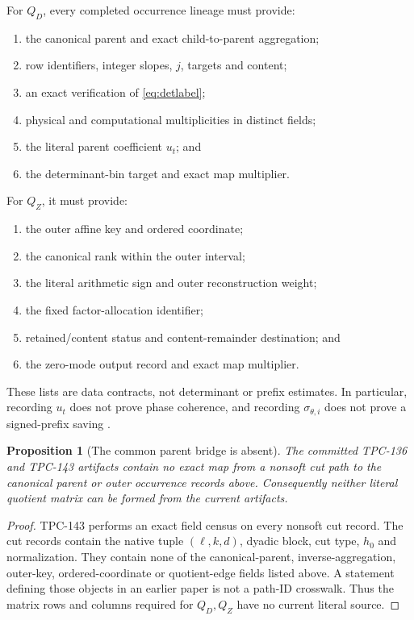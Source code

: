 \documentclass[11pt]{article}
\newtheorem{proposition}[theorem]{Proposition}
\theoremstyle{definition}
\theoremstyle{remark}
\begin{document}
For \(Q_D\), every completed occurrence lineage must provide:
\begin{enumerate}[label=\textbf{D\arabic*.},leftmargin=2.8em]
\item the canonical parent and exact child-to-parent aggregation;
\item row identifiers, integer slopes, \(j\), targets and content;
\item an exact verification of \eqref{eq:detlabel};
\item physical and computational multiplicities in distinct fields;
\item the literal parent coefficient \(u_t\); and
\item the determinant-bin target and exact map multiplier.
\end{enumerate}

For \(Q_Z\), it must provide:
\begin{enumerate}[label=\textbf{Z\arabic*.},leftmargin=2.8em]
\item the outer affine key and ordered coordinate;
\item the canonical rank within the outer interval;
\item the literal arithmetic sign and outer reconstruction weight;
\item the fixed factor-allocation identifier;
\item retained/content status and content-remainder destination; and
\item the zero-mode output record and exact map multiplier.
\end{enumerate}

These lists are data contracts, not determinant or prefix estimates.
In particular, recording \(u_t\) does not prove phase coherence, and
recording \(\sigma_{\theta,i}\) does not prove a signed-prefix saving
\citep{WangTPC121,WangTPC122}.

\begin{proposition}[The common parent bridge is absent]
\label{prop:missing}
The committed TPC-136 and TPC-143 artifacts contain no exact map from
a nonsoft cut path to the canonical parent or outer occurrence
records above.  Consequently neither literal quotient matrix can be
formed from the current artifacts.
\end{proposition}

\begin{proof}
TPC-143 performs an exact field census on every nonsoft cut record.
The cut records contain the native tuple \((\ell,k,d)\), dyadic block,
cut type, \(h_0\) and normalization.  They contain none of the
canonical-parent, inverse-aggregation, outer-key, ordered-coordinate
or quotient-edge fields listed above.  A statement defining those
objects in an earlier paper is not a path-ID crosswalk.  Thus the
matrix rows and columns required for \(Q_D,Q_Z\) have no current
literal source.
\end{proof}
\end{document}
